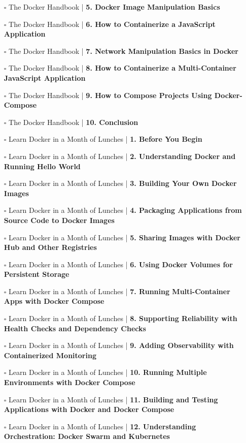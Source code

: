 \documentclass[a4, landscape, 12pt]{article}
\newcommand{\checkbox}{$\square$}%
\begin{document}
\begin{itemize}
{}
\item [\checkbox]  The Docker Handbook | \textbf{ 5. Docker Image Manipulation Basics
}
\item [\checkbox]  The Docker Handbook | \textbf{ 6. How to Containerize a JavaScript Application
}
\item [\checkbox]  The Docker Handbook | \textbf{ 7. Network Manipulation Basics in Docker
}
\item [\checkbox]  The Docker Handbook | \textbf{ 8. How to Containerize a Multi-Container JavaScript Application
}
\item [\checkbox]  The Docker Handbook | \textbf{ 9. How to Compose Projects Using Docker-Compose
}
\item [\checkbox]  The Docker Handbook | \textbf{ 10. Conclusion
}
\item [\checkbox]  Learn Docker in a Month of Lunches | \textbf{ 1. Before You Begin
}
\item [\checkbox]  Learn Docker in a Month of Lunches | \textbf{ 2. Understanding Docker and Running Hello World
}
\item [\checkbox]  Learn Docker in a Month of Lunches | \textbf{ 3. Building Your Own Docker Images
}
\item [\checkbox]  Learn Docker in a Month of Lunches | \textbf{ 4. Packaging Applications from Source Code to Docker Images
}
\item [\checkbox]  Learn Docker in a Month of Lunches | \textbf{ 5. Sharing Images with Docker Hub and Other Registries
}
\item [\checkbox]  Learn Docker in a Month of Lunches | \textbf{ 6. Using Docker Volumes for Persistent Storage
}
\item [\checkbox]  Learn Docker in a Month of Lunches | \textbf{ 7. Running Multi-Container Apps with Docker Compose
}
\item [\checkbox]  Learn Docker in a Month of Lunches | \textbf{ 8. Supporting Reliability with Health Checks and Dependency Checks
}
\item [\checkbox]  Learn Docker in a Month of Lunches | \textbf{ 9. Adding Observability with Containerized Monitoring
}
\item [\checkbox]  Learn Docker in a Month of Lunches | \textbf{ 10. Running Multiple Environments with Docker Compose
}
\item [\checkbox]  Learn Docker in a Month of Lunches | \textbf{ 11. Building and Testing Applications with Docker and Docker Compose
}
\item [\checkbox]  Learn Docker in a Month of Lunches | \textbf{ 12. Understanding Orchestration: Docker Swarm and Kubernetes
}
\end{itemize}
\end{document}
